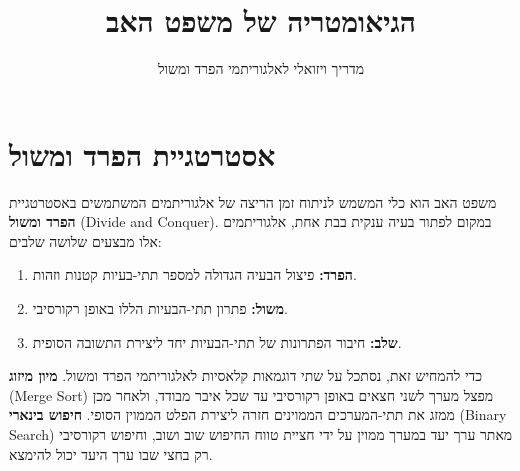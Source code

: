 \documentclass[11pt, a4paper]{article}
\title{\Huge \textbf{הגיאומטריה של משפט האב}}
\author{מדריך ויזואלי לאלגוריתמי הפרד ומשול}
\date{}
\begin{document}
\maketitle

\section*{אסטרטגיית הפרד ומשול}

משפט האב הוא כלי המשמש לניתוח זמן הריצה של אלגוריתמים המשתמשים באסטרטגיית \textbf{הפרד ומשול} (\textenglish{Divide and Conquer}). במקום לפתור בעיה ענקית בבת אחת, אלגוריתמים אלו מבצעים שלושה שלבים:
\begin{enumerate}
    \item \textbf{הפרד:} פיצול הבעיה הגדולה למספר תתי-בעיות קטנות וזהות.
    \item \textbf{משול:} פתרון תתי-הבעיות הללו באופן רקורסיבי.
    \item \textbf{שלב:} חיבור הפתרונות של תתי-הבעיות יחד ליצירת התשובה הסופית.
\end{enumerate}

כדי להמחיש זאת, נסתכל על שתי דוגמאות קלאסיות לאלגוריתמי הפרד ומשול. \textbf{מיון מיזוג} (\textenglish{Merge Sort}) מפצל מערך לשני חצאים באופן רקורסיבי עד שכל איבר מבודד, ולאחר מכן ממזג את תתי-המערכים הממוינים חזרה ליצירת הפלט הממוין הסופי. \textbf{חיפוש בינארי} (\textenglish{Binary Search}) מאתר ערך יעד במערך ממוין על ידי חציית טווח החיפוש שוב ושוב, וחיפוש רקורסיבי רק בחצי שבו ערך היעד יכול להימצא.
\end{document}
